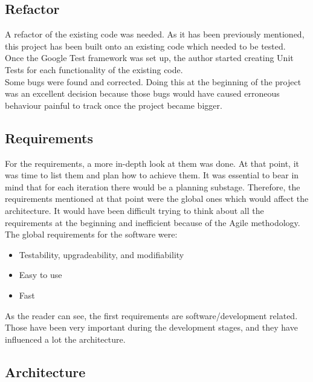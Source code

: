 \subsection{Refactor}

A refactor of the existing code was needed. As it has been previously mentioned, this project has been built onto an existing code which needed to be tested.  \\
Once the Google Test framework was set up, the author started creating Unit Tests for each functionality of the existing code. \\
Some bugs were found and corrected. Doing this at the beginning of the project was an excellent decision because those bugs would have caused erroneous behaviour painful to track once the project became bigger. 

\subsection{Requirements}
For the requirements, a more in-depth look at them was done. At that point, it was time to list them and plan how to achieve them. It was essential to bear in mind that for each iteration there would be a planning substage. Therefore, the requirements mentioned at that point were the global ones which would affect the architecture. It would have been difficult trying to think about all the requirements at the beginning and inefficient because of the Agile methodology. The global requirements for the software were: 

\begin{itemize}
	\item Testability, upgradeability, and modifiability
	\item Easy to use
	\item Fast
\end{itemize}
As the reader can see, the first requirements are software/development related. Those have been very important during the development stages, and they have influenced a lot the architecture.  

\subsection{Architecture}


